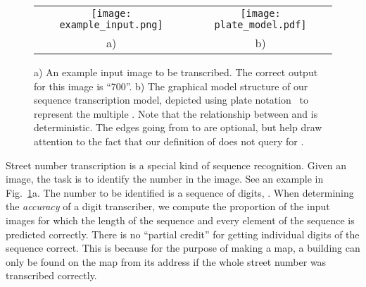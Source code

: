 \documentclass{article} \usepackage{comment}
\begin{document}
\begin{figure}
\centering
\begin{tabular}{cc}
\texttt{[image: example\_input.png]} &\texttt{[image: plate\_model.pdf]} \\
a) & b)\\
\end{tabular}
\iffalse
\begin{subfigure}{.49\textwidth}
\centering
\texttt{[image: example\_input.png]}
\label{fig:example_input}
\end{subfigure}\begin{subfigure}{.49\textwidth}
\centering
\texttt{[image: plate\_model.pdf]}
\label{fig:plate}
\end{subfigure}
\fi
\caption{a) An example input image to be transcribed. The correct output for this image is ``700''. 
b) The graphical model structure of our sequence transcription model, depicted
using plate notation~\citep{Buntine94} to represent the multiple . Note that the relationship
between  and  is deterministic. The edges going from  to  are optional,
but help draw attention to the fact that our definition of  does not
query  for .}
\label{hacky_fig}
\end{figure}

Street number transcription is a special kind of sequence recognition. Given an image, the task
is to identify the number in the image. See an example in Fig.~\ref{hacky_fig}a. The
number to be identified is a sequence of digits, . When determining
the {\em accuracy} of a digit transcriber, we compute the proportion of the input images for
which the length  of the sequence and every element  of the sequence is predicted correctly.
There is no ``partial credit'' for getting individual digits of the sequence correct. This is
because for the purpose of making a map, a building can only be found on the map from its address
if the whole street number was transcribed correctly.
\end{document}
